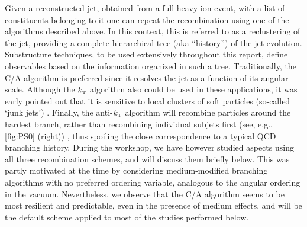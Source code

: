 Given a reconstructed jet, obtained from a full heavy-ion event, with a list of constituents belonging to it
one can repeat the recombination using one of the algorithms described above. 
In this context, this is referred to as a reclustering of the jet, providing a complete hierarchical tree (aka ``history'') of the jet evolution. Substructure techniques, to be used extensively throughout this report, define observables based on the information organized in such a tree. 
Traditionally, the C/A algorithm is preferred since it resolves the jet as a function of its angular scale. Although the $k_{\text{\tiny T}}$ algorithm also could be used in these applications, it was early pointed out that it is sensitive to local clusters of soft particles (so-called `junk jets') \cite{Dokshitzer:1997in}. Finally, the anti-$k_{\text{\tiny T}}$ algorithm will recombine particles around the hardest branch, rather than recombining individual subjets first (see, e.g., \autoref{fig:PS0} (right)) \cite{Salam:2009jx}, thus spoiling the close correspondence to a typical QCD branching history. 
During the workshop, we have however studied aspects using all three recombination schemes, and will discuss them briefly below. This was partly motivated at the time by considering medium-modified branching algorithms with no preferred ordering variable, analogous to the angular ordering in the vacuum. Nevertheless, we observe that the C/A algorithm seems to be most resilient and predictable, even in the presence of medium effects, and will be the default scheme applied to most of the studies performed below.



